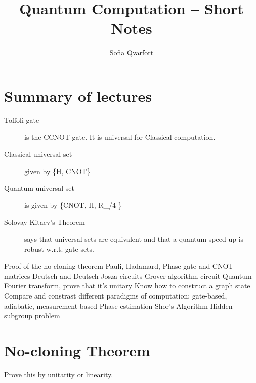 


\title{Quantum Computation -- Short Notes}
\author{Sofia Qvarfort}
\maketitle
\tableofcontents
\section{Summary of lectures}
\begin{description}

\item[Toffoli gate] is the CCNOT gate. It is universal for Classical computation. 

\item[Classical universal set] given by 
\beq
\{H, CNOT\}
\eeq

\item[Quantum universal set] 
is given by 
\beq
\{CNOT, H, R_{\pi/4} \}
\eeq


\item[Solovay-Kitaev's Theorem] says that universal sets are equivalent and that a quantum speed-up is robust w.r.t. gate sets. 





\end{description}
Proof of the no cloning theorem
Pauli, Hadamard, Phase gate and CNOT matrices
Deutsch and Deutsch-Josza circuits
Grover algorithm circuit
Quantum Fourier transform, prove that it's unitary
Know how to construct a graph state
Compare and constrast different paradigms of computation: gate-based, adiabatic, measurement-based
Phase estimation
Shor's Algorithm
Hidden subgroup problem

\section{No-cloning Theorem}
Prove this by unitarity or linearity. 


